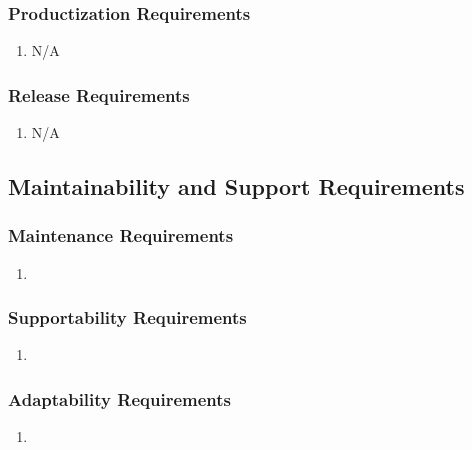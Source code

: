 \documentclass[]{article}
\begin{document}
\subsubsection{Productization Requirements}
\label{ssub:productization_requirements}
\begin{enumerate}[{OE}1. ]
	\item N/A
\end{enumerate}

\subsubsection{Release Requirements}
\label{ssub:release_requirements}
\begin{enumerate}[{OE}1. ]
	\item N/A
\end{enumerate}



\subsection{Maintainability and Support Requirements}
\label{sub:maintainability_and_support_requirements}

\subsubsection{Maintenance Requirements}
\label{ssub:maintenance_requirements}
\begin{enumerate}[{MS}1. ]
	\item 
\end{enumerate}

\subsubsection{Supportability Requirements}
\label{ssub:supportability_requirements}
\begin{enumerate}[{MS}1. ]
	\item 
\end{enumerate}

\subsubsection{Adaptability Requirements}
\label{ssub:adaptability_requirements}
\begin{enumerate}[{MS}1. ]
	\item 
\end{enumerate}
\end{document}
